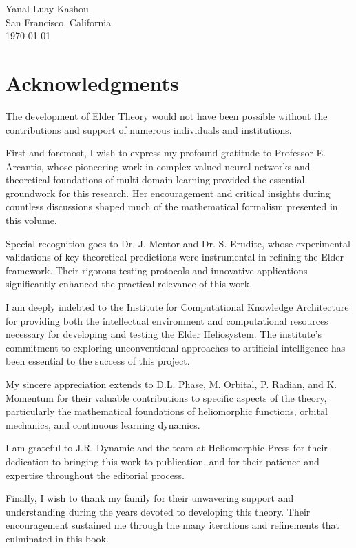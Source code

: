\documentclass[11pt,twoside]{book}
\begin{document}
\vspace{1cm}
\begin{flushright}
Yanal Luay Kashou\\
San Francisco, California\\
\today
\end{flushright}

\chapter*{Acknowledgments}

The development of Elder Theory would not have been possible without the contributions and support of numerous individuals and institutions.

First and foremost, I wish to express my profound gratitude to Professor E. Arcantis, whose pioneering work in complex-valued neural networks and theoretical foundations of multi-domain learning provided the essential groundwork for this research. Her encouragement and critical insights during countless discussions shaped much of the mathematical formalism presented in this volume.

Special recognition goes to Dr. J. Mentor and Dr. S. Erudite, whose experimental validations of key theoretical predictions were instrumental in refining the Elder framework. Their rigorous testing protocols and innovative applications significantly enhanced the practical relevance of this work.

I am deeply indebted to the Institute for Computational Knowledge Architecture for providing both the intellectual environment and computational resources necessary for developing and testing the Elder Heliosystem. The institute's commitment to exploring unconventional approaches to artificial intelligence has been essential to the success of this project.

My sincere appreciation extends to D.L. Phase, M. Orbital, P. Radian, and K. Momentum for their valuable contributions to specific aspects of the theory, particularly the mathematical foundations of heliomorphic functions, orbital mechanics, and continuous learning dynamics.

I am grateful to J.R. Dynamic and the team at Heliomorphic Press for their dedication to bringing this work to publication, and for their patience and expertise throughout the editorial process.

Finally, I wish to thank my family for their unwavering support and understanding during the years devoted to developing this theory. Their encouragement sustained me through the many iterations and refinements that culminated in this book.
\end{document}
